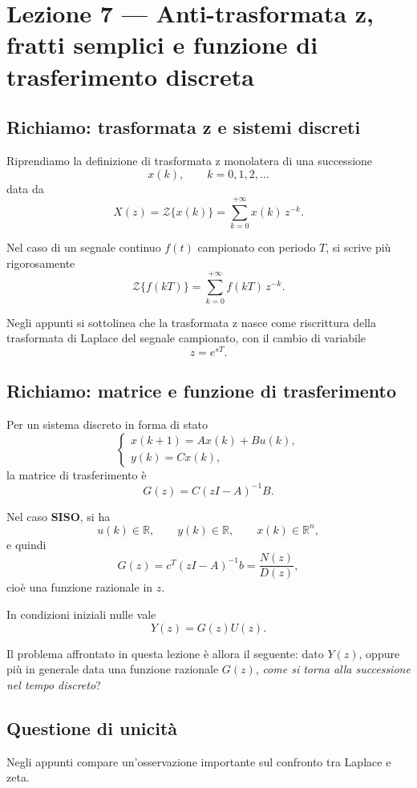 \chapter{Lezione 7 --- Anti-trasformata z, fratti semplici e funzione di trasferimento discreta}

\section{Richiamo: trasformata z e sistemi discreti}

Riprendiamo la definizione di trasformata z monolatera di una successione
\[
x(k), \qquad k=0,1,2,\dots
\]
data da
\[
X(z)=\mathcal{Z}\{x(k)\}=\sum_{k=0}^{+\infty} x(k)\,z^{-k}.
\]

Nel caso di un segnale continuo \(f(t)\) campionato con periodo \(T\), si scrive pi\`u rigorosamente
\[
\mathcal{Z}\{f(kT)\}=\sum_{k=0}^{+\infty} f(kT)\,z^{-k}.
\]

Negli appunti si sottolinea che la trasformata z nasce come riscrittura della trasformata di Laplace
del segnale campionato, con il cambio di variabile
\[
z=e^{sT}.
\]

\section{Richiamo: matrice e funzione di trasferimento}

Per un sistema discreto in forma di stato
\[
\begin{cases}
x(k+1)=Ax(k)+Bu(k),\\[4pt]
y(k)=Cx(k),
\end{cases}
\]
la matrice di trasferimento \`e
\[
G(z)=C(zI-A)^{-1}B.
\]

Nel caso \textbf{SISO}, si ha
\[
u(k)\in\mathbb{R}, \qquad y(k)\in\mathbb{R}, \qquad x(k)\in\mathbb{R}^n,
\]
e quindi
\[
G(z)=c^T(zI-A)^{-1}b=\frac{N(z)}{D(z)},
\]
cio\`e una funzione razionale in \(z\).

In condizioni iniziali nulle vale
\[
Y(z)=G(z)U(z).
\]

Il problema affrontato in questa lezione \`e allora il seguente:
dato \(Y(z)\), oppure pi\`u in generale data una funzione razionale \(G(z)\),
\emph{come si torna alla successione nel tempo discreto}?

\section{Questione di unicit\`a}

Negli appunti compare un'osservazione importante sul confronto tra Laplace e zeta.

